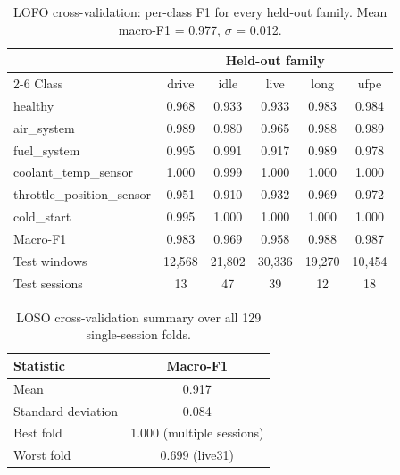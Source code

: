 \begin{table}[H]
  \centering
  \caption{LOFO cross-validation: per-class F1 for every held-out family.
    Mean macro-F1 = 0.977, $\sigma$ = 0.012.}
  \label{tab:lofofull}
  \begin{tabular}{lccccc}
    \toprule
    & \multicolumn{5}{c}{Held-out family}\\
    \cmidrule(lr){2-6}
    Class & drive & idle & live & long & ufpe\\
    \midrule
    healthy                    & 0.968 & 0.933 & 0.933 & 0.983 & 0.984\\
    air\_system                & 0.989 & 0.980 & 0.965 & 0.988 & 0.989\\
    fuel\_system               & 0.995 & 0.991 & 0.917 & 0.989 & 0.978\\
    coolant\_temp\_sensor      & 1.000 & 0.999 & 1.000 & 1.000 & 1.000\\
    throttle\_position\_sensor & 0.951 & 0.910 & 0.932 & 0.969 & 0.972\\
    cold\_start                & 0.995 & 1.000 & 1.000 & 1.000 & 1.000\\
    \midrule
    Macro-F1                   & 0.983 & 0.969 & 0.958 & 0.988 & 0.987\\
    Test windows               & 12{,}568 & 21{,}802 & 30{,}336 & 19{,}270 & 10{,}454\\
    Test sessions              & 13 & 47 & 39 & 12 & 18\\
    \bottomrule
  \end{tabular}
\end{table}

\begin{table}[H]
  \centering
  \caption{LOSO cross-validation summary over all 129 single-session folds.}
  \label{tab:losofull}
  \begin{tabular}{lc}
    \toprule
    Statistic & Macro-F1\\
    \midrule
    Mean               & 0.917\\
    Standard deviation & 0.084\\
    Best fold          & 1.000 (multiple sessions)\\
    Worst fold         & 0.699 (live31)\\
    \bottomrule
  \end{tabular}
\end{table}

